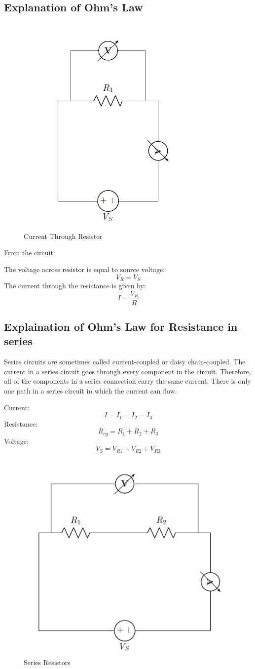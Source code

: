 		\subsection{Explanation of Ohm's Law}
			\begin{figure}[h]
				\centering
				\includegraphics[width=0.5\linewidth]{img/exp4/1}
				\caption{Current Through Resistor}
				\label{fig:currentThroughResistor}
			\end{figure}
			From the circuit:
			
			The voltage across resistor is equal to source voltage:
			$$V_R=V_S$$
			The current through the resistance is given by:
			$$I=\frac{V_R}{R}$$
		
		\subsection{Explaination of Ohm's Law for Resistance in series}
			Series circuits are sometimes called current-coupled or daisy chain-coupled. The current in a series circuit goes through every component in the circuit. Therefore, all of the components in a series connection carry the same current. There is only one path in a series circuit in which the current can flow.
			
			Current:
			$$I=I_1=I_2=I_3$$
			Resistance:
			$$R_{eq}=R_1+R_2+R_3$$
			Voltage:
			$$V_S=V_{R1}+V_{R2}+V_{R3}$$
			\begin{figure}[h]
				\centering
				\includegraphics[width=0.5\linewidth]{img/exp4/2}
				\caption{Series Resistors}
				\label{fig:seriesResistors}
			\end{figure}
		
